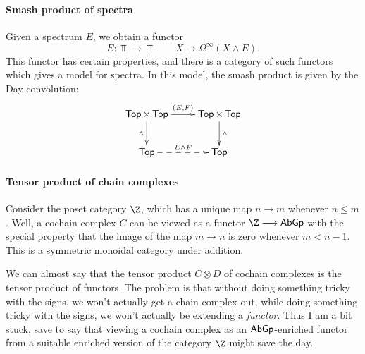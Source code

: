 \documentclass[11pt]{article}
\begin{document}
\begin{1. Kan Extensions}
\begin{shaded}
\paragraph*{Smash product of spectra}
Given a spectrum $E$, we obtain a functor
\[E:\Top\to\Top\qquad X\mapsto \Omega^\infty(X\wedge E).\]
This functor has certain properties, and there is a category of such functors which gives a model for spectra. In this model, the smash product is given by the Day convolution:
\[\xymatrix{
\Top\times\Top\ar[r]^-{(E,F)}\ar[d]_-{\wedge }&%
\Top\times\Top\ar[d]^-{\wedge }\\%
\Top\ar@{-->}[r]^-{E\wedge F}&%
\Top%
}\]
\paragraph*{Tensor product of chain complexes}
Consider the poset category $\Z$, which has a unique map $n\to m$ whenever $n\leq m$. Well, a cochain complex $C$ can be viewed as a functor $\Z\to\AbGp$ with the special property that the image of the map $m\to n$ is zero whenever $m<n-1$. This is a symmetric monoidal category under addition.

We can almost say that the tensor product $C\otimes D$ of cochain complexes is the tensor product of functors. The problem is that without doing something tricky with the signs, we won't actually get a chain complex out, while doing something tricky with the signs, we won't actually be extending a \emph{functor}. Thus I am a bit stuck, save to say that viewing a cochain complex as an $\operatorname{{\mathsf{AbGp}}}$-enriched functor from a suitable enriched version of the category $\Z$ might save the day.
\end{shaded}
\end{1. Kan Extensions}
\begin{2. Derived functors via deformations}

\end{2. Derived functors via deformations}
\end{document}
